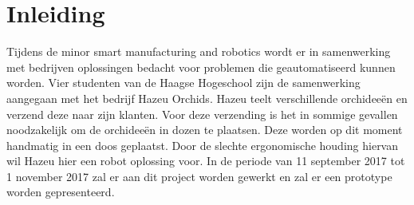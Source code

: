 \section{Inleiding}

Tijdens de minor smart manufacturing and robotics wordt er in samenwerking met bedrijven oplossingen bedacht voor problemen die geautomatiseerd kunnen worden. Vier studenten van de Haagse Hogeschool zijn de samenwerking aangegaan met het bedrijf Hazeu Orchids. Hazeu teelt verschillende orchideeën en verzend deze naar zijn klanten. Voor deze verzending is het in sommige gevallen noodzakelijk om de orchideeën in dozen te plaatsen. Deze worden op dit moment handmatig in een doos geplaatst. Door de slechte ergonomische houding hiervan wil Hazeu hier een robot oplossing voor. In de periode van 11 september 2017 tot 1 november 2017 zal er aan dit project worden gewerkt en zal er een prototype worden gepresenteerd.

\newpage
